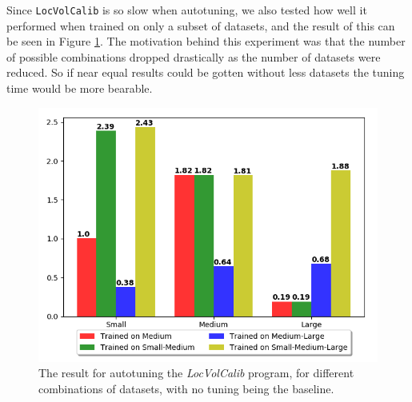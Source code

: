 Since \texttt{LocVolCalib} is so slow when autotuning, we also tested how well
it performed when trained on only a subset of datasets, and the result of this
can be seen in Figure \ref{LocVolCalibAll}. The motivation behind this
experiment was that the number of possible combinations dropped drastically as
the number of datasets were reduced. So if near equal results could be gotten
without less datasets the tuning time would be more bearable.

\begin{figure}[H]
	\centering
	\includegraphics[width=.7\textwidth]{../benchmarks/LocVolCalibAll.png}
  \caption{The result for autotuning the \textit{LocVolCalib} program, for different combinations of datasets, with no tuning being the baseline.}
	\label{LocVolCalibAll}
\end{figure}
